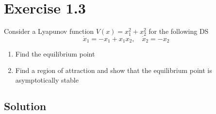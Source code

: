 \section*{Exercise 1.3}

Consider a Lyapunov function \( V(x)=x_{1}^{2}+x_{2}^{2} \) for the following DS
\begin{equation*}
    \dot{x}_{1}=-x_{1}+x_{1} x_{2}, \quad \dot{x}_{2}=-x_{2}
\end{equation*}
\begin{enumerate}[noitemsep]
    \item Find the equilibrium point
    \item Find a region of attraction and show that the equilibrium point is asymptotically stable
\end{enumerate}

\subsection*{Solution}
